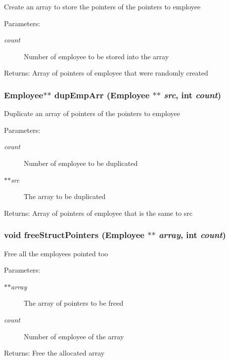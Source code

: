 Create an array to store the pointers of the pointers to employee \begin{Desc}
\item[Parameters:]
\begin{description}
\item[{\em count}]Number of employee to be stored into the array \end{description}
\end{Desc}
\begin{Desc}
\item[Returns:]Array of pointers of employee that were randomly created \end{Desc}
\subsubsection{\setlength{\rightskip}{0pt plus 5cm}\bf{Employee}$\ast$$\ast$ dup\-Emp\-Arr (\bf{Employee} $\ast$$\ast$ {\em src}, int {\em count})}\label{employee_8c_492f9f099d5fd760173e275afd9a204e}


Duplicate an array of pointers of the pointers to employee \begin{Desc}
\item[Parameters:]
\begin{description}
\item[{\em count}]Number of employee to be duplicated \item[{\em $\ast$$\ast$src}]The array to be duplicated \end{description}
\end{Desc}
\begin{Desc}
\item[Returns:]Array of pointers of employee that is the same to src \end{Desc}
\subsubsection{\setlength{\rightskip}{0pt plus 5cm}void free\-Struct\-Pointers (\bf{Employee} $\ast$$\ast$ {\em array}, int {\em count})}\label{employee_8c_8cbffab9992d4581bf1ebe9a9f9b7808}


Free all the employees pointed too \begin{Desc}
\item[Parameters:]
\begin{description}
\item[{\em $\ast$$\ast$array}]The array of pointers to be freed \item[{\em count}]Number of employee of the array \end{description}
\end{Desc}
\begin{Desc}
\item[Returns:]Free the allocated array \end{Desc}
